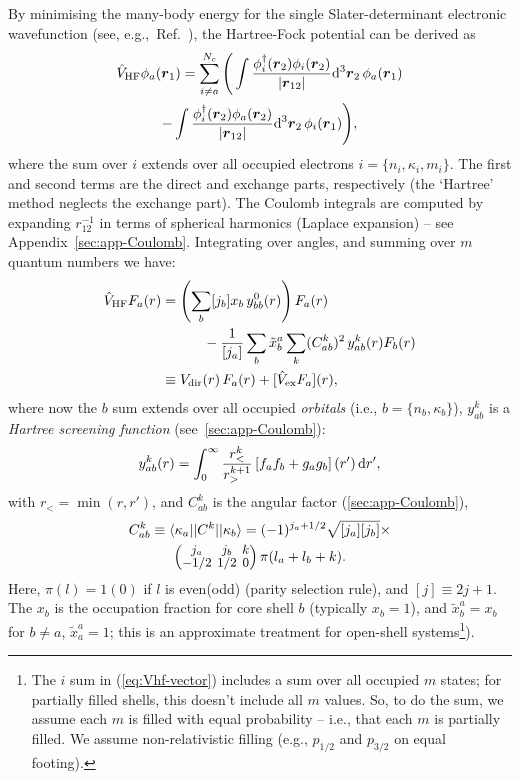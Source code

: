 \documentclass[10pt,twocolumn,a4paper]{article}%
\newcommand{\bra}[1]{\ensuremath{\langle #1|}}	%
\newcommand{\ket}[1]{\ensuremath{|#1\rangle}}	%
\newcommand{\threej}[6]{
\renewcommand\arraystretch{0.75}\setlength\arraycolsep{2pt}
\small\ensuremath{\begin{pmatrix}#1&#2&#3\\#4&#5&#6\end{pmatrix}}
}	%
\renewcommand{\v}[1]{\ensuremath{\boldsymbol{#1}}}		%
\newcommand{\be}{\begin{equation}}
\newcommand{\ee}{\end{equation}}
\def\d{\ensuremath{{\rm d}}}
\renewcommand{\k}{\ensuremath{\kappa}}
\begin{document}
By minimising the many-body energy for the single Slater-determinant electronic wavefunction (see, e.g.,~Ref.~\cite{JohnsonBook2007}), the Hartree-Fock potential can be derived as
\begin{multline}\label{eq:Vhf-vector}
\hat V_{\rm HF}\phi_a(\v{r}_1) = \sum_{i\neq a}^{N_c}\Bigg(
\int \frac{\phi_i^\dag(\v{r}_2)\phi_i(\v{r}_2)}{|\v{r}_{12}|}\d^3\v{r}_2\,\phi_a(\v{r}_1)\\
-\int \frac{\phi_i^\dag(\v{r}_2)\phi_a(\v{r}_2)}{|\v{r}_{12}|}\d^3\v{r}_2\,\phi_i(\v{r}_1)
\Bigg),
\end{multline}
where the sum over $i$ extends over all occupied electrons $i=\{n_i,\k_i,m_i\}$.
The first and second terms are the direct and exchange parts, respectively (the `Hartree' method neglects the exchange part).
The Coulomb integrals are computed by expanding ${r}_{12}^{-1}$ in terms of spherical harmonics (Laplace expansion) -- see Appendix~\ref{sec:app-Coulomb}.
Integrating over angles, and summing over $m$ quantum numbers we have:
\begin{align}
\label{eq:Vhf-radial}
\hat V_{\rm HF}F_a(r)& = \left(\sum_b [j_b] x_b  \,  y^0_{bb}(r)\right)F_a(r)
\notag \\  & \qquad\quad
-\frac{1}{[j_a]}\sum_b \tilde x_b^{a}\sum_k (C^k_{ab})^2\, y^k_{ab}(r) F_b(r)  \\
\label{eq:Vhf}
&\equiv V_{\rm dir}(r)\,F_a(r) + [\hat V_{\rm ex}F_a](r),
\end{align}
where now the $b$ sum extends over all occupied {\em orbitals} (i.e., $b=\{n_b,\k_b\}$),
$y_{ab}^k$ is a {\sl Hartree screening function} (see~\ref{sec:app-Coulomb}):
%
\be\label{eq:ykab}
y^k_{ab}(r) = \int_0^\infty \frac{r_<^k}{r_>^{k+1}}\left[f_a f_b + g_a g_b\right](r')\, \d r',
\ee
with $r_{<} = \min(r,r')$, and
$C^k_{ab}$ is the angular factor (\ref{sec:app-Coulomb}),
%
\begin{multline}\label{eq:Ckab}
C^k_{ab}\equiv\bra{\k_a}|C^k|\ket{\k_b} = (-1)^{j_a+1/2}\sqrt{[j_a][j_b]}\times\\\threej{j_a}{j_b}{k}{-1/2}{1/2}{0}\pi(l_a+l_b+k).
\end{multline}
Here, $\pi(l)=1(0)$ if $l$ is even(odd) (parity selection rule), and $[j]\equiv2j+1$.
The $x_b$ is the occupation fraction for core shell $b$ (typically $x_b=1$), and
$\tilde x^a_b = x_b$ for $b\neq a$,  $\tilde x^a_a = 1$; this is an approximate treatment for open-shell systems\footnote{The $i$ sum in (\ref{eq:Vhf-vector}) includes a sum over all occupied $m$ states; for partially filled shells, this doesn't include all $m$ values. So, to do the sum, we assume each $m$ is filled with equal probability -- i.e., that each $m$ is partially filled. We assume non-relativistic filling (e.g., $p_{1/2}$ and $p_{3/2}$ on equal footing).}).
\end{document}
